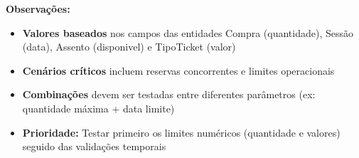 \documentclass{article}
\begin{document}
\textbf{Observações:}
\begin{itemize}
\item \textbf{Valores baseados} nos campos das entidades Compra (quantidade), Sessão (data), Assento (disponivel) e TipoTicket (valor)
\item \textbf{Cenários críticos} incluem reservas concorrentes e limites operacionais
\item \textbf{Combinações} devem ser testadas entre diferentes parâmetros (ex: quantidade máxima + data limite)
\item \textbf{Prioridade:} Testar primeiro os limites numéricos (quantidade e valores) seguido das validações temporais
\end{itemize}
\end{document}

